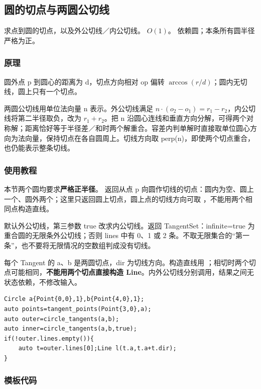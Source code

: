 \subsection{圆的切点与两圆公切线}
\label{geo:tangents}
\AlgorithmInfo
    {求点到圆的切点，以及外公切线／内公切线。}
    {$O(1)$。}
    {依赖圆；本条所有圆半径严格为正。}
\subsubsection*{原理}

圆外点 p 到圆心的距离为 d，切点方向相对 op 偏转 $\arccos(r/d)$；圆内无切线，圆上只有一个切点。

两圆公切线用单位法向量 n 表示。外公切线满足 $n\cdot(o_2-o_1)=r_1-r_2$，内公切线将第二半径取负，改为 $r_1+r_2$。把 n 沿圆心连线和垂直方向分解，可得两个对称解；距离恰好等于半径差／和时两个解重合。容差内判单解时直接取单位圆心方向为法向量，保持切点在各自圆周上。切线方向取 perp(n)，即使两个切点重合，也仍能表示整条切线。

\subsubsection*{使用教程}
本节两个圆均要求\textbf{严格正半径}。 返回从点 p 向圆作切线的切点：圆内为空、圆上一个、圆外两个；这里只返回圆上切点，圆上点的切线方向可取 ，不能用两个相同点构造直线。

 默认外公切线，第三参数 true 改求内公切线。返回 TangentSet：infinite=true 为重合圆的无限条外公切线；否则 lines 中有 0、1 或 2 条。不取无限集合的“第一条”，也不要将无限情况的空数组判成没有切线。

每个 Tangent 的 a、b 是两圆切点，dir 为切线方向。构造直线用 ；相切时两个切点可能相同，\textbf{不能用两个切点直接构造 Line}。内外公切线分别调用，结果之间无状态依赖，不修改输入。
\begin{lstlisting}[style=mtycpp,numbers=none]
Circle a{Point{0,0},1},b{Point{4,0},1};
auto points=tangent_points(Point{3,0},a);
auto outer=circle_tangents(a,b);
auto inner=circle_tangents(a,b,true);
if(!outer.lines.empty()){
	auto t=outer.lines[0];Line l(t.a,t.a+t.dir);
}
\end{lstlisting}
\subsubsection*{模板代码}
